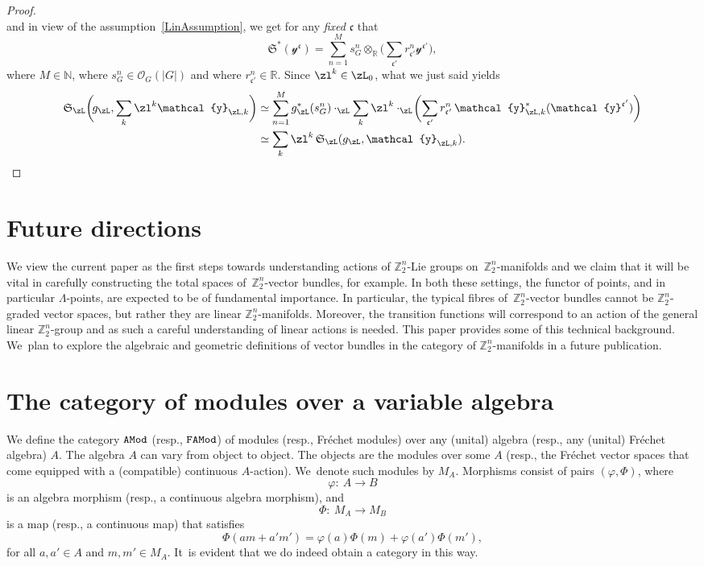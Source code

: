\documentclass[10pt,a4paper]{amsart}
\newcommand{\R}{{\mathbb R}}
\newcommand{\Z}{{\mathbb Z}}
\def\cO{\mathcal{O}}
\newcommand{\0}{\otimes}
\numberwithin{equation}{section}
\begin{document}
\begin{proof}
\[\]
and in view of the assumption~\eqref{LinAssumption}, we get for any {\it fixed} $\mathfrak{c}$ that
\[
\mathfrak{S}^*(\mathcal{y}^{\mathfrak{c}}) =\sum_{n=1}^{M}s_G^n\0_\R\bigg(\sum_{\mathfrak{c'}}r^n_{\mathfrak{c'}}\mathcal{y}^{\mathfrak{c'}}\bigg),
\]
where $M\in\mathbb{N}$, where $s_G^n\in\cO_G(|G|)$ and where $r^n_{\mathfrak{c'}}\in\R$. Since $\zl^k\in\zL_0$, what we just said yields
\begin{align*}
\mathfrak{S}_\zL\bigg(\!g_\zL,\sum_k\zl^k\mathcal{y}_{\zL,k}\bigg)& \simeq\sum_{n=1}^{M}g^*_\zL(s_G^n) \cdot_\zL\sum_k\zl^k\cdot_\zL\!\bigg(\!\sum_{\mathfrak{c'}}r^n_{\mathfrak{c'}}\,
\mathcal{y}_{\zL,k}^*(\mathcal{y}^{\mathfrak{c'}})\bigg)\\
& \simeq\sum_k\zl^k\, \mathfrak{S}_\zL(g_\zL,\mathcal{y}_{\zL,k}). \tag*{\qed}
\end{align*}
\renewcommand{\qed}{}
\end{proof}


\section{Future directions}
We view the current paper as the first steps towards understanding actions of $\Z_2^n$-Lie groups on~$\Z_2^n$-manifolds and we claim that it will be vital in carefully constructing the total spaces of~$\Z_2^n$-vector bundles, for example. In both these settings, the functor of points, and in particular $\Lambda$-points, are expected to be of fundamental importance. In particular, the typical fibres of~$\Z_2^n$-vector bundles cannot be $\Z_2^n$-graded vector spaces, but rather they are linear $\Z_2^n$-manifolds. Moreover, the transition functions will correspond to an action of the general linear $\Z_2^n$-group and as such a careful understanding of linear actions is needed. This paper provides some of this technical background. We~plan to explore the algebraic and geometric definitions of vector bundles in the category of $\Z_2^n$-manifolds in a future publication.

\appendix
\section{The category of modules over a variable algebra}\label{app:CatModAlg}
We define the category $\tt AMod$ (resp., $\tt FAMod$) of modules (resp., Fr\'echet modules) over any (unital) algebra (resp., any (unital) Fr\'echet algebra) $A$. The algebra $A$ can vary from object to object. The objects are the modules over some $A$ (resp., the Fr\'echet vector spaces that come equipped with a (compatible) continuous $A$-action). We~denote such modules by $M_{A}$. Morphisms consist of pairs $(\varphi , \Phi)$, where
\[
\varphi \colon\ A \longrightarrow B
\]
is an algebra morphism (resp., a continuous algebra morphism), and
\[
\Phi \colon\ M_A \longrightarrow M_B
\]
is a map (resp., a continuous map) that satisfies
\[
\Phi(a m + a'm') = \varphi(a) \Phi(m) + \varphi(a')\Phi(m'),
\]
for all $a,a' \in A$ and $m,m' \in M_A$. It~is evident that we do indeed obtain a category in this way.
%
\end{document}
